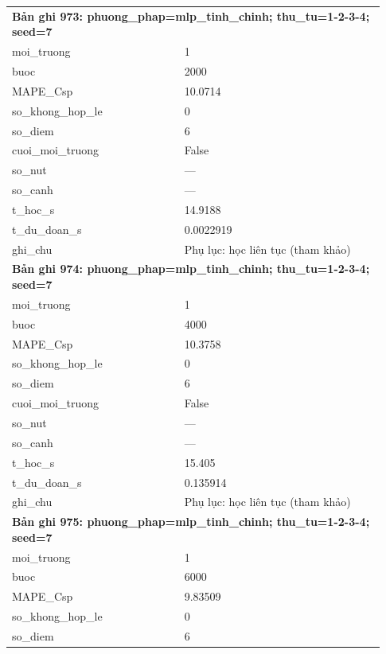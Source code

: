 \begin{longtable}{p{0.43\linewidth}p{0.50\linewidth}}
\midrule
\multicolumn{2}{p{0.95\linewidth}}{\textbf{Bản ghi 973: phuong\_phap=mlp\_tinh\_chinh; thu\_tu=1-2-3-4; seed=7}} \\
moi\_\allowbreak truong & 1 \\
buoc & 2000 \\
MAPE\_\allowbreak Csp & 10.0714 \\
so\_\allowbreak khong\_\allowbreak hop\_\allowbreak le & 0 \\
so\_\allowbreak diem & 6 \\
cuoi\_\allowbreak moi\_\allowbreak truong & False \\
so\_\allowbreak nut & — \\
so\_\allowbreak canh & — \\
t\_\allowbreak hoc\_\allowbreak s & 14.9188 \\
t\_\allowbreak du\_\allowbreak doan\_\allowbreak s & 0.0022919 \\
ghi\_\allowbreak chu & Phụ lục: học liên tục (tham khảo) \\
\midrule
\multicolumn{2}{p{0.95\linewidth}}{\textbf{Bản ghi 974: phuong\_phap=mlp\_tinh\_chinh; thu\_tu=1-2-3-4; seed=7}} \\
moi\_\allowbreak truong & 1 \\
buoc & 4000 \\
MAPE\_\allowbreak Csp & 10.3758 \\
so\_\allowbreak khong\_\allowbreak hop\_\allowbreak le & 0 \\
so\_\allowbreak diem & 6 \\
cuoi\_\allowbreak moi\_\allowbreak truong & False \\
so\_\allowbreak nut & — \\
so\_\allowbreak canh & — \\
t\_\allowbreak hoc\_\allowbreak s & 15.405 \\
t\_\allowbreak du\_\allowbreak doan\_\allowbreak s & 0.135914 \\
ghi\_\allowbreak chu & Phụ lục: học liên tục (tham khảo) \\
\midrule
\multicolumn{2}{p{0.95\linewidth}}{\textbf{Bản ghi 975: phuong\_phap=mlp\_tinh\_chinh; thu\_tu=1-2-3-4; seed=7}} \\
moi\_\allowbreak truong & 1 \\
buoc & 6000 \\
MAPE\_\allowbreak Csp & 9.83509 \\
so\_\allowbreak khong\_\allowbreak hop\_\allowbreak le & 0 \\
so\_\allowbreak diem & 6 \\

\end{longtable}
